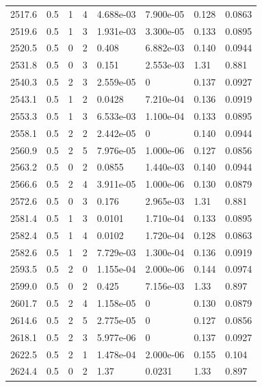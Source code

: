\documentclass[preview]{standalone}
\begin{document}
{{{{{{{{{{\begin{tabular}{L{1.2cm}C{1.2cm} C{0.3cm}C{0.5cm} C{1.4cm}C{1.4cm} C{1.4cm}C{1.4cm}}
  2517.6  &   0.5  & 1     &  4 &  4.688e-03  & 7.900e-05  & 0.128 &  0.0863   \\ 
  2519.6  &   0.5  & 1     &  3 &  1.931e-03  & 3.300e-05  & 0.133 &  0.0895   \\ 
  2520.5  &   0.5  & 0     &  2 &  0.408  & 6.882e-03  & 0.140 &  0.0944   \\ 
  2531.8  &   0.5  & 0     &  3 &  0.151  & 2.553e-03  & 1.31 &  0.881   \\ 
  2540.3  &   0.5  & 2     &  3 &  2.559e-05  & 0  & 0.137 &  0.0927   \\ 
  2543.1  &   0.5  & 1     &  2 &  0.0428  & 7.210e-04  & 0.136 &  0.0919   \\ 
  2553.3  &   0.5  & 1     &  3 &  6.533e-03  & 1.100e-04  & 0.133 &  0.0895   \\ 
  2558.1  &   0.5  & 2     &  2 &  2.442e-05  & 0  & 0.140 &  0.0944   \\ 
  2560.9  &   0.5  & 2     &  5 &  7.976e-05  & 1.000e-06  & 0.127 &  0.0856   \\ 
  2563.2  &   0.5  & 0     &  2 &  0.0855  & 1.440e-03  & 0.140 &  0.0944   \\ 
  2566.6  &   0.5  & 2     &  4 &  3.911e-05  & 1.000e-06  & 0.130 &  0.0879   \\ 
  2572.6  &   0.5  & 0     &  3 &  0.176  & 2.965e-03  & 1.31 &  0.881   \\ 
  2581.4  &   0.5  & 1     &  3 &  0.0101  & 1.710e-04  & 0.133 &  0.0895   \\ 
  2582.4  &   0.5  & 1     &  4 &  0.0102  & 1.720e-04  & 0.128 &  0.0863   \\ 
  2582.6  &   0.5  & 1     &  2 &  7.729e-03  & 1.300e-04  & 0.136 &  0.0919   \\ 
  2593.5  &   0.5  & 2     &  0 &  1.155e-04  & 2.000e-06  & 0.144 &  0.0974   \\ 
  2599.0  &   0.5  & 0     &  2 &  0.425  & 7.156e-03  & 1.33 &  0.897   \\ 
  2601.7  &   0.5  & 2     &  4 &  1.158e-05  & 0  & 0.130 &  0.0879   \\ 
  2614.6  &   0.5  & 2     &  5 &  2.775e-05  & 0  & 0.127 &  0.0856   \\ 
  2618.1  &   0.5  & 2     &  3 &  5.977e-06  & 0  & 0.137 &  0.0927   \\ 
  2622.5  &   0.5  & 2     &  1 &  1.478e-04  & 2.000e-06  & 0.155 &  0.104   \\ 
  2624.4  &   0.5  & 0     &  2 &  1.37  & 0.0231  & 1.33 &  0.897   \\ 

\end{tabular}}}}}}}}}}}
\end{document}
